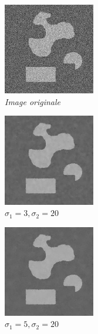 \documentclass[a4,12pt]{article}
\begin{document}
\noindent
\begin{minipage}[c]{0.33\linewidth}
	\begin{center}
		\includegraphics[width = 40mm]{./img/formOrig.jpg}\\
		\textit{Image originale}\\
	\end{center}
\end{minipage}
\begin{minipage}[c]{0.33\linewidth}
	\begin{center}
		\includegraphics[width = 40mm]{./img/formbb25Bil3_20.jpg}\\
		\textit{$\sigma_1=3, \sigma_2=20$}\\
	\end{center}
\end{minipage}
\begin{minipage}[c]{0.33\linewidth}
	\begin{center}
		\includegraphics[width = 40mm]{./img/formbb25Bil5_20.jpg}\\
		\textit{$\sigma_1=5, \sigma_2=20$}\\
	\end{center}
\end{minipage}\\
\end{document}
